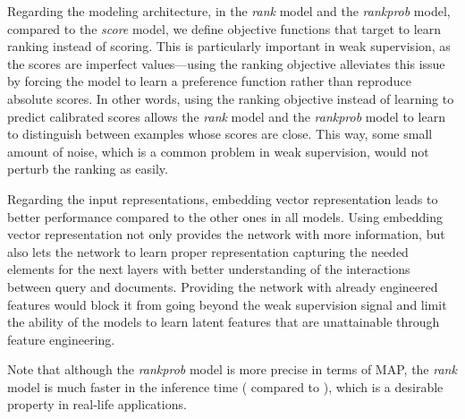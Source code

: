 \documentclass[sigconf]{acmart}
\newcommand{\modelone}{\textit{score} model\xspace}
\newcommand{\modeltwo}{\textit{rank} model\xspace}
\newcommand{\modelthree}{\textit{rank\-prob} model\xspace}
\newcommand{\feedthree}{embedding vector representation\xspace}
\def\:{\hskip0pt} \newcommand{\mypar}[1]{\vspace*{-0.1ex}\medskip\noindent\textbf{#1}~}
\begin{document}
Regarding the modeling architecture, in the \modeltwo and the \modelthree, compared to the \modelone, we define objective functions that target to learn ranking instead of scoring. This is particularly important in weak supervision, as the scores are imperfect values\:---\:using the ranking objective alleviates this issue by forcing the model to learn a preference function rather than reproduce absolute scores.
In other words, using the ranking objective instead of learning to predict calibrated scores allows the \modeltwo and the \modelthree to learn to distinguish between examples whose scores are close. This way, some small amount of noise, which is a common problem in weak supervision, would not perturb the ranking as easily.

Regarding the input representations, \feedthree leads to better performance compared to the other ones in all models.
Using \feedthree not only provides the network with more information, but also lets the network to learn proper representation capturing the needed elements for the next layers with better understanding of the interactions between query and documents. 
Providing the network with already engineered features would block it from going beyond the weak supervision signal and limit the ability of the models to learn latent features that are unattainable through feature engineering. 

Note that although the \modelthree is more precise in terms of MAP, the \modeltwo is much faster in the inference time ( compared to ), which is a desirable property in real-life applications.
\end{document}

